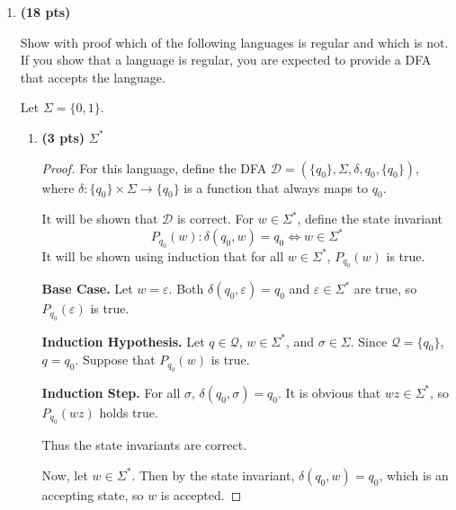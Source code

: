 \documentclass[11pt]{article}
\begin{document}
	\begin{enumerate}[label=\textbf{Q\arabic*.}]


\item \textbf{(18 pts)}

Show with proof which of the following languages is regular and which is not. If you show that a language is regular, you are expected to provide a DFA that accepts the language. 

Let $ \Sigma = \{0,1\} $.

\begin{enumerate}[label=\textit{\alph*)}]
	\item \textbf{(3 pts)} $ \Sigma^* $
	
	\begin{proof}
		For this language, define the DFA \(\mathcal{D} = (\{q_0\}, \Sigma, \delta , q_0, \{q_0\})\), where \(\delta : \{q_0\} \times \Sigma \to \{q_0\}\) is a function that always maps to \(q_0\).
		\begin{center}
		\end{center}
		It will be shown that \(\mathcal{D}\) is correct. For \(w \in \Sigma ^*\), define the state invariant
		\[
			P_{q_0}(w) : \delta (q_0, w) = q_0 \iff w \in \Sigma ^*
		\]
		It will be shown using induction that for all \(w \in \Sigma ^*\), \(P_{q_0}(w)\) is true.

		\medskip

		\textbf{Base Case.} Let \(w = \varepsilon\). Both \(\delta (q_0, \varepsilon) = q_0\) and \(\varepsilon \in \Sigma ^*\) are true, so \(P_{q_0}(\varepsilon)\) is true.

		\medskip

		\textbf{Induction Hypothesis.} Let \(q \in \mathcal{Q}\), \(w \in \Sigma ^*\), and \(\sigma \in \Sigma\). Since \(\mathcal{Q} = \{q_0\}\), \(q = q_0\). Suppose that \(P_{q_0}(w)\) is true.

		\medskip

		\textbf{Induction Step.} For all \(\sigma\), \(\delta (q_0, \sigma) = q_0\). It is obvious that \(wz \in \Sigma ^*\), so \(P_{q_0}(wz)\) holds true.
		
		Thus the state invariants are correct.

		Now, let \(w \in \Sigma ^*\). Then by the state invariant, \(\delta (q_0, w) = q_0\), which is an accepting state, so \(w\) is accepted.


\end{proof}
\end{enumerate}
\end{enumerate}
\end{document}
